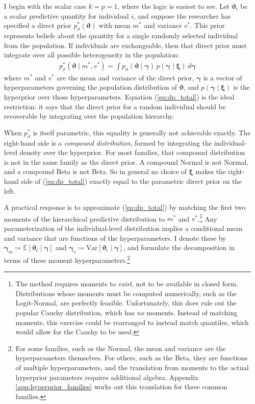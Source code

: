 \documentclass[12pt,a4paper]{article}
\theoremstyle{definition}
\theoremstyle{remark}
\newcommand{\E}[1]{\mathbb{E}\left[#1\right]}
\newcommand{\Var}[1]{\text{Var}\left[#1\right]}
\newcommand{\bv}{\boldsymbol{\vartheta}}
\newcommand{\hype}{\boldsymbol{\gamma}}
\newcommand{\hypem}{\boldsymbol{\gamma}_m}
\newcommand{\hypev}{\boldsymbol{\gamma}_v}
\newcommand{\dpm}{m^*}
\newcommand{\dpv}{v^*}
\newcommand{\hprior}{\boldsymbol{\xi}}
\begin{document}
I begin with the scalar case $k = p = 1$, where the logic is easiest to see.
Let $\bv{}_i$ be a scalar predictive quantity for individual $i$, and suppose
the researcher has specified a direct prior $p^*_\vartheta(\bv{})$ with mean
$\dpm$ and variance $\dpv$. This prior represents beliefs about the quantity
for a single randomly selected individual from the population. If individuals
are exchangeable, then that direct prior must integrate over all possible
heterogeneity in the population:
\begin{align}
\label{eq:dp_total}
p^*_\vartheta(\bv{} \mid \dpm, \dpv) = \int p_\vartheta(\bv{} \mid \hype{})\, p(\hype{} \mid \hprior{})\, d\hype{}
\end{align}
\noindent where $\dpm$ and $\dpv$ are the mean and variance of the direct
prior, $\hype{}$ is a vector of hyperparameters governing the population
distribution of $\bv{}$, and $p(\hype{} \mid \hprior{})$ is the hyperprior over
those hyperparameters. Equation (\ref{eq:dp_total}) is the ideal restriction:
it says that the direct prior for a random individual should be recoverable by
integrating over the population hierarchy.

When $p^*_\vartheta$ is itself parametric, this equality is generally not
achievable exactly. The right-hand side is a \textit{compound distribution},
formed by integrating the individual-level density over the hyperprior. For
most families, that compound distribution is not in the same family as the
direct prior. A compound Normal is not Normal, and a compound Beta is not Beta.
So in general no choice of $\hprior{}$ makes the right-hand side of
(\ref{eq:dp_total}) exactly equal to the parametric direct prior on the left.

A practical response is to approximate (\ref{eq:dp_total}) by matching the
first two moments of the hierarchical predictive distribution to $\dpm$ and
$\dpv$.\footnote{
  The method requires moments to \textit{exist}, not to be available in closed
  form. Distributions whose moments must be computed numerically, such as the
  Logit-Normal, are perfectly feasible. Unfortunately, this does rule out the
  popular Cauchy distribution, which has \textit{no} moments. Instead of
  matching moments, this exercise could be rearranged to instead match
  quantiles, which would allow for the Cauchy to be used.
}
Any parameterization of the individual-level distribution implies a conditional
mean and variance that are functions of the hyperparameters. I denote these by
$\hypem \coloneqq \E{\bv_i \mid \hype}$ and $\hypev \coloneqq
\Var{\bv_i \mid \hype}$, and formulate the decomposition in terms of these
moment hyperparameters.\footnote{
  For some families, such as the Normal, the mean and variance are the
  hyperparameters themselves. For others, such as the Beta, they are functions
  of multiple hyperparameters, and the translation from moments to the actual
  hyperprior parameters requires additional algebra.
  Appendix \ref{app:hyperprior_families} works out this translation for three
  common families.
}
\end{document}
